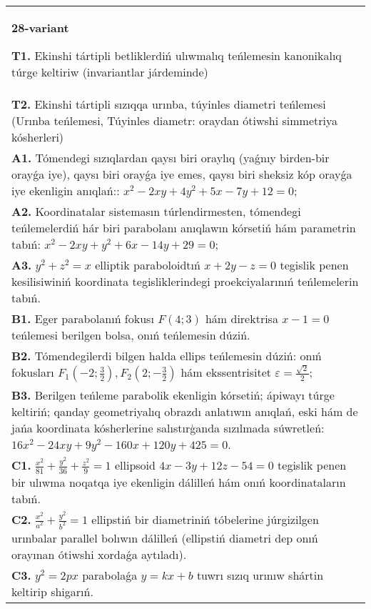 \documentclass{article}
\begin{document}
\begin{tabular}{m{17cm}}
\textbf{28-variant}
\newline

\textbf{T1.} Ekinshi tártipli betliklerdiń ulıwmalıq teńlemesin kanonikalıq túrge keltiriw (invariantlar járdeminde) \\
\textbf{T2.} Ekinshi tártipli sızıqqa urınba, túyinles diametri teńlemesi (Urınba teńlemesi, Túyinles diametr: oraydan ótiwshi simmetriya kósherleri) \\
\textbf{A1.} Tómendegi sızıqlardan qaysı biri oraylıq (yaǵnıy birden-bir orayǵa iye), qaysı biri orayǵa iye emes, qaysı biri sheksiz kóp orayǵa iye ekenligin anıqlań:: $x^2-2 x y+4 y^2+5 x-7 y+12=0$; \\
\textbf{A2.} Koordinatalar sistemasın túrlendirmesten, tómendegi teńlemelerdiń hár biri parabolanı anıqlawın kórsetiń hám parametrin tabıń: $x^2-2 x y+y^2+6 x-14 y+29=0$; \\
\textbf{A3.} $y^2+z^2=x$ elliptik paraboloidtıń $x+2 y-z=0$ tegislik penen kesilisiwiniń koordinata tegisliklerindegi proekciyalarınıń teńlemelerin tabıń. \\
\textbf{B1.} Eger parabolanıń fokusı $F (4;3) $ hám direktrisa $x-1=0$ teńlemesi berilgen bolsa, onıń teńlemesin dúziń. \\
\textbf{B2.} Tómendegilerdi bilgen halda ellips teńlemesin dúziń: onıń fokusları $F_1\left(-2; \frac{3}{2}\right), F_2\left(2;-\frac{3}{2}\right) $ hám ekssentrisitet $\varepsilon=\frac{\sqrt{2}}{2}$; \\
\textbf{B3.} Berilgen teńleme parabolik ekenligin kórsetiń; ápiwayı túrge keltiriń; qanday geometriyalıq obrazdı anlatıwın anıqlań, eski hám de jańa koordinata kósherlerine salıstırģanda sızılmada súwretleń:$16 x^2-24 x y+9 y^2-160 x+120 y+425=0$. \\
\textbf{C1.} $\frac{x^2}{81}+\frac{y^2}{36}+\frac{z^2}{9}=1$ ellipsoid $4 x-3 y+12 z-54=0$ tegislik penen bir ulıwma noqatqa iye ekenligin dálilleń hám onıń koordinataların tabıń. \\
\textbf{C2.} $\frac{x^2}{a^2}+\frac{y^2}{b^2}=1$ ellipstiń bir diametriniń tóbelerine júrgizilgen urınbalar parallel bolıwın dálilleń (ellipstiń diametri dep onıń orayınan ótiwshi xordaǵa aytıladı). \\
\textbf{C3.} $y^2=2 p x$ parabolaǵa $y=k x+b$ tuwrı sızıq urınıw shártin keltirip shigarıń. \\

\end{tabular}
\vspace{1cm}
\end{document}
